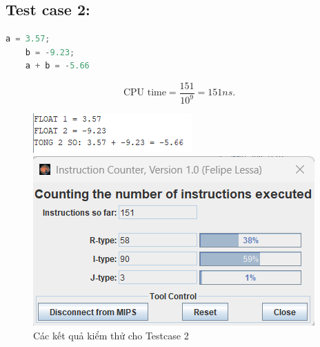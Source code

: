 \subsection{Test case 2:}
\begin{lstlisting}[language=Python]
    a = 3.57;
    b = -9.23;
    a + b = -5.66
\end{lstlisting}
\[
\text{CPU time} = \frac{\text{151}}{10^9} = 151 ns.
\]
\begin{figure}[!h]
    \centering
    \begin{minipage}[b]{0.48\textwidth}
        \centering
        \includegraphics[width=\textwidth]{image/TESTCASE/Testcase 2.png}
    \end{minipage}
    \hfill
    \begin{minipage}[b]{0.48\textwidth}
        \centering
        \includegraphics[width=\textwidth]{image/TESTCASE/Instruction Counter 2.png}
    \end{minipage}
    \vspace{0.5cm}
    \caption{Các kết quả kiểm thử cho Testcase 2}
\end{figure}

\vspace{0.5cm}

